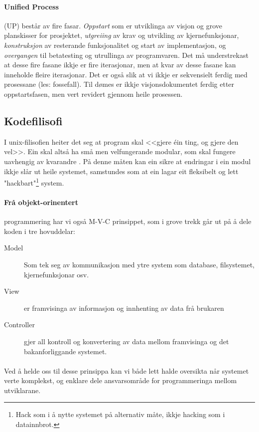 \documentclass[nynorsk,12pt,a4paper,oneside]{book}
\begin{document}
\paragraph{Unified Process} (UP) består av fire fasar. \emph{Oppstart} som er utviklinga av visjon og grove planskisser for prosjektet, \emph{utgreiing} av krav og utvikling av kjernefunksjonar, \emph{konstruksjon} av resterande funksjonalitet og start av implementasjon, og \emph{overgangen} til betatesting og utrullinga av programvaren. \cite{upxpuml} Det må understrekast at desse fire fasane ikkje er fire iterasjonar, men at kvar av desse fasane kan inneholde fleire iterasjonar. Det er også slik at vi ikkje er sekvensielt ferdig med prosessane (les: fossefall). Til dømes er ikkje visjonsdokumentet ferdig etter oppstartsfasen, men vert revidert gjennom heile prosessen. 

\subsection{Kodefilisofi}
I unix-filisofien heiter det seg at program skal <<gjere éin ting, og gjere den vel>>. Ein skal altså ha små men velfungerande modular, som skal fungere uavhengig av kvarandre \cite{unixprog}. På denne måten kan ein sikre at endringar i ein modul ikkje slår ut heile systemet, samstundes som at ein lagar eit fleksibelt og lett "hackbart"\footnote{Hack som i å nytte systemet på alternativ måte, ikkje hacking som i datainnbrot.} system. 

\paragraph{Frå objekt-orinentert} programmering har vi også M-V-C prinsippet, som i grove trekk går ut på å dele koden i tre hovuddelar: \cite{mvc}

\begin{description}
	\item[Model] Som tek seg av kommunikasjon med ytre system som database, filsystemet, kjernefunksjonar osv.
	\item[View] er framvisinga av informasjon og innhenting av data frå brukaren
	\item[Controller] gjer all kontroll og konvertering av data mellom framvisinga og det bakanforliggande systemet.
\end{description}

\paragraph{}
Ved å helde oss til desse prinsippa kan vi både lett halde oversikta når systemet verte komplekst, og enklare dele ansvarsområde for programmeringa mellom utviklarane.
\end{document}
